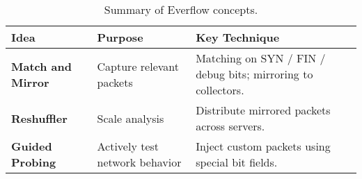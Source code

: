 \begin{table}[!htp]
    \centering
    \begin{adjustbox}{width={\textwidth},totalheight={\textheight},keepaspectratio}
        \begin{tabular}{@{} l | l | p{15em} @{}}
            \toprule
            Idea & Purpose & Key Technique \\
            \midrule
            \textbf{Match and Mirror}   & Capture relevant packets          & Matching on SYN / FIN / debug bits; mirroring to collectors. \\ [.5em]
            \textbf{Reshuffler}         & Scale analysis                    & Distribute mirrored packets across servers. \\ [.5em]
            \textbf{Guided Probing}     & Actively test network behavior    & Inject custom packets using special bit fields. \\
            \bottomrule
        \end{tabular}
    \end{adjustbox}
    \caption{Summary of Everflow concepts.}
\end{table}

